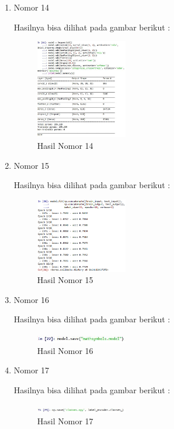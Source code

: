 \begin{enumerate}
\item Nomor 14
\hfill\break
	
Hasilnya bisa dilihat pada gambar berikut :
\hfill\break
	\begin{figure}[H]
		\includegraphics[width=4cm]{figures/1174054/7/24.JPG}
		\centering
		\caption{Hasil Nomor 14}
	\end{figure}
	
\item Nomor 15
\hfill\break
	
Hasilnya bisa dilihat pada gambar berikut :
\hfill\break
	\begin{figure}[H]
		\includegraphics[width=4cm]{figures/1174054/7/25.PNG}
		\centering
		\caption{Hasil Nomor 15}
	\end{figure}

\item Nomor 16
\hfill\break
	
Hasilnya bisa dilihat pada gambar berikut :
\hfill\break
	\begin{figure}[H]
		\includegraphics[width=4cm]{figures/1174054/7/26.JPG}
		\centering
		\caption{Hasil Nomor 16}
	\end{figure}
	
\item Nomor 17
\hfill\break
	
Hasilnya bisa dilihat pada gambar berikut :
\hfill\break
	\begin{figure}[H]
		\includegraphics[width=4cm]{figures/1174054/7/27.JPG}
		\centering
		\caption{Hasil Nomor 17}
	\end{figure}
	

\end{enumerate}
